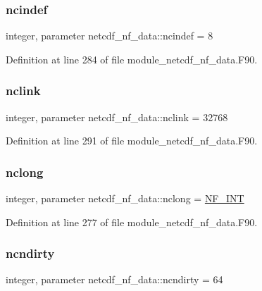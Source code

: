 \subsubsection{\texorpdfstring{ncindef}{ncindef}}
{\footnotesize\ttfamily integer, parameter netcdf\+\_\+nf\+\_\+data\+::ncindef = 8}



Definition at line 284 of file module\+\_\+netcdf\+\_\+nf\+\_\+data.\+F90.

\mbox{\label{namespacenetcdf__nf__data_aa409f012252d130729e94dddd572e375}} 
\subsubsection{\texorpdfstring{nclink}{nclink}}
{\footnotesize\ttfamily integer, parameter netcdf\+\_\+nf\+\_\+data\+::nclink = 32768}



Definition at line 291 of file module\+\_\+netcdf\+\_\+nf\+\_\+data.\+F90.

\mbox{\label{namespacenetcdf__nf__data_a0da55fa021c2f3d2712d1ec30c4973d3}} 
\subsubsection{\texorpdfstring{nclong}{nclong}}
{\footnotesize\ttfamily integer, parameter netcdf\+\_\+nf\+\_\+data\+::nclong = \hyperlink{ncfortran_8h_aec6fe8ae8c73cf5133d4ed64f86ff028}{N\+F\+\_\+\+I\+NT}}



Definition at line 277 of file module\+\_\+netcdf\+\_\+nf\+\_\+data.\+F90.

\mbox{\label{namespacenetcdf__nf__data_a501e623096ba68a005164d17ec4d8d49}} 
\subsubsection{\texorpdfstring{ncndirty}{ncndirty}}
{\footnotesize\ttfamily integer, parameter netcdf\+\_\+nf\+\_\+data\+::ncndirty = 64}



